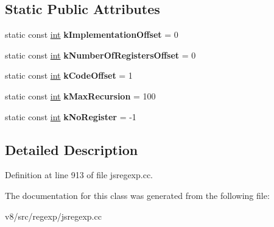 \subsection*{Static Public Attributes}
\begin{DoxyCompactItemize}
\item 
\mbox{\label{classv8_1_1internal_1_1RegExpCompiler_a25cdd87f20befcbf492dba4d8879d7db}} 
static const \mbox{\hyperlink{classint}{int}} {\bfseries k\+Implementation\+Offset} = 0
\item 
\mbox{\label{classv8_1_1internal_1_1RegExpCompiler_a3f79771d4cc180edef0a3873e9b08b5e}} 
static const \mbox{\hyperlink{classint}{int}} {\bfseries k\+Number\+Of\+Registers\+Offset} = 0
\item 
\mbox{\label{classv8_1_1internal_1_1RegExpCompiler_aba94df58a0e68431d9ba15eee19a9546}} 
static const \mbox{\hyperlink{classint}{int}} {\bfseries k\+Code\+Offset} = 1
\item 
\mbox{\label{classv8_1_1internal_1_1RegExpCompiler_a20ca0907396d11d68732f878a36b5cc3}} 
static const \mbox{\hyperlink{classint}{int}} {\bfseries k\+Max\+Recursion} = 100
\item 
\mbox{\label{classv8_1_1internal_1_1RegExpCompiler_a70d86cf98e453fe3aad673ccd021092e}} 
static const \mbox{\hyperlink{classint}{int}} {\bfseries k\+No\+Register} = -\/1
\end{DoxyCompactItemize}


\subsection{Detailed Description}


Definition at line 913 of file jsregexp.\+cc.



The documentation for this class was generated from the following file\+:\begin{DoxyCompactItemize}
\item 
v8/src/regexp/jsregexp.\+cc\end{DoxyCompactItemize}
